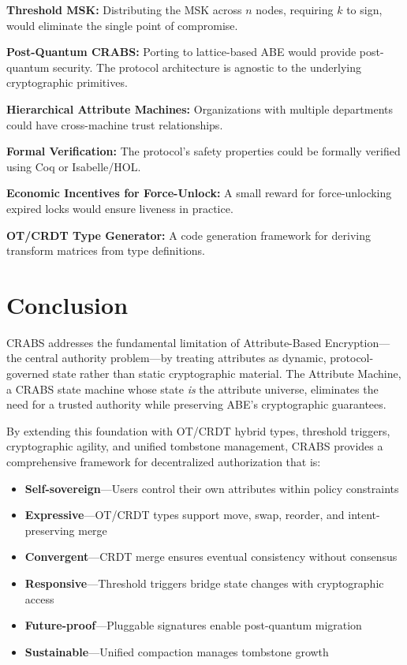 \documentclass[sigconf,nonacm]{acmart}
\newcommand{\crab}{\textsc{CRABS}}
\begin{document}
\textbf{Threshold MSK:} Distributing the MSK across $n$ nodes, requiring $k$ to sign, would eliminate the single point of compromise.

\textbf{Post-Quantum \crab{}:} Porting to lattice-based ABE would provide post-quantum security. The protocol architecture is agnostic to the underlying cryptographic primitives.

\textbf{Hierarchical Attribute Machines:} Organizations with multiple departments could have cross-machine trust relationships.

\textbf{Formal Verification:} The protocol's safety properties could be formally verified using Coq or Isabelle/HOL.

\textbf{Economic Incentives for Force-Unlock:} A small reward for force-unlocking expired locks would ensure liveness in practice.

\textbf{OT/CRDT Type Generator:} A code generation framework for deriving transform matrices from type definitions.

\section{Conclusion}

\crab{} addresses the fundamental limitation of Attribute-Based Encryption---the central authority problem---by treating attributes as dynamic, protocol-governed state rather than static cryptographic material. The Attribute Machine, a \crab{} state machine whose state \textit{is} the attribute universe, eliminates the need for a trusted authority while preserving ABE's cryptographic guarantees.

By extending this foundation with OT/CRDT hybrid types, threshold triggers, cryptographic agility, and unified tombstone management, \crab{} provides a comprehensive framework for decentralized authorization that is:

\begin{itemize}
    \item \textbf{Self-sovereign}---Users control their own attributes within policy constraints
    \item \textbf{Expressive}---OT/CRDT types support move, swap, reorder, and intent-preserving merge
    \item \textbf{Convergent}---CRDT merge ensures eventual consistency without consensus
    \item \textbf{Responsive}---Threshold triggers bridge state changes with cryptographic access
    \item \textbf{Future-proof}---Pluggable signatures enable post-quantum migration
    \item \textbf{Sustainable}---Unified compaction manages tombstone growth
\end{itemize}
\end{document}
